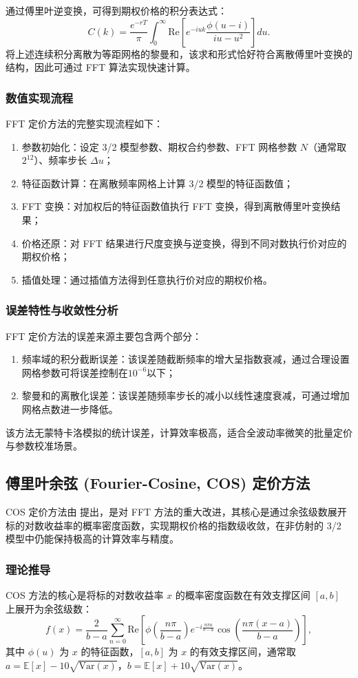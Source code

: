 通过傅里叶逆变换，可得到期权价格的积分表达式：\begin {equation}C (k) = \frac {e^{-rT}}{\pi} \int_0^\infty \text {Re}\left [ e^{-i u k} \frac {\phi (u - i)}{i u - u^2} \right] du.\end {equation}
将上述连续积分离散为等距网格的黎曼和，该求和形式恰好符合离散傅里叶变换的结构，因此可通过 FFT 算法实现快速计算。
\subsubsection{数值实现流程}
FFT 定价方法的完整实现流程如下：
\begin{enumerate}
    \item 参数初始化：设定 3/2 模型参数、期权合约参数、FFT 网格参数 $N$（通常取 $2^{12}$）、频率步长 $\Delta u$；
    \item 特征函数计算：在离散频率网格上计算 3/2 模型的特征函数值；
    \item FFT 变换：对加权后的特征函数值执行 FFT 变换，得到离散傅里叶变换结果；
    \item 价格还原：对 FFT 结果进行尺度变换与逆变换，得到不同对数执行价对应的期权价格；
    \item 插值处理：通过插值方法得到任意执行价对应的期权价格。
\end{enumerate}
\subsubsection {误差特性与收敛性分析}FFT 定价方法的误差来源主要包含两个部分：
\begin {enumerate}
  \item 频率域的积分截断误差：该误差随截断频率的增大呈指数衰减，通过合理设置网格参数可将误差控制在$10^{−6}$以下；
  \item 黎曼和的离散化误差：该误差随频率步长的减小以线性速度衰减，可通过增加网格点数进一步降低。
\end {enumerate}
该方法无蒙特卡洛模拟的统计误差，计算效率极高，适合全波动率微笑的批量定价与参数校准场景。

\subsection{傅里叶余弦 (Fourier-Cosine, COS) 定价方法}
COS 定价方法由 \cite{fangNovelPricingMethod2009} 提出，是对 FFT 方法的重大改进，其核心是通过余弦级数展开标的对数收益率的概率密度函数，实现期权价格的指数级收敛，在非仿射的 3/2 模型中仍能保持极高的计算效率与精度。

\subsubsection{理论推导}
COS 方法的核心是将标的对数收益率 $x$ 的概率密度函数在有效支撑区间 $[a,b]$ 上展开为余弦级数：
\begin{equation}
f(x) = \frac{2}{b-a} \sum_{n=0}^{\infty} \text{Re} \left[ \phi\left( \frac{n\pi}{b-a} \right) e^{-i \frac{n\pi a}{b-a}} \cos\left( \frac{n\pi (x-a)}{b-a} \right) \right],
\end{equation}
其中 $\phi(u)$ 为 $x$ 的特征函数，$[a,b]$ 为 $x$ 的有效支撑区间，通常取 $a = \mathbb{E}[x] - 10\sqrt{\mathrm{Var}(x)}$，$b = \mathbb{E}[x] + 10\sqrt{\mathrm{Var}(x)}$。

